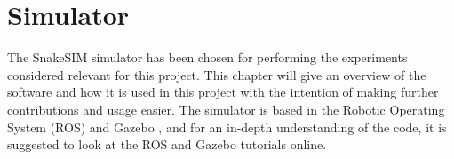 \chapter{Simulator}\label{chapter:simulator}

The SnakeSIM simulator \cite{sanfilippo2018snakesim} has been chosen for performing the experiments considered relevant for this project. This chapter will give an overview of the software and how it is used in this project with the intention of making further contributions and usage easier. The simulator is based in the Robotic Operating System (ROS) \cite{quigley2009ros} and Gazebo \cite{koenig2004design}, and for an in-depth understanding of the code, it is suggested to look at the ROS and Gazebo tutorials online.




%
%